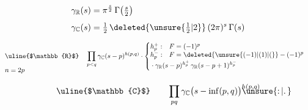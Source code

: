 \[
\begin{aligned}
\gamma_{\mathbb{R}}(s)&=\pi^{\frac{s}{2}}\,\Gamma\bigl(\tfrac{s}{2}\bigr)\\[4pt]
\gamma_{\mathbb{C}}(s)&=\tfrac{1}{2}\,\deleted{\unsure{\tfrac{1}{2}|2}}\,(2\pi)^{s}\,\Gamma(s)
\end{aligned}
\]

\[
\begin{aligned}
&\begin{aligned}[t]
&\text{\uline{$\mathbb{R}$}}\\[6pt]
&n=2p
\end{aligned}
\quad
\prod_{p<q}\gamma_{\mathbb{C}}(s-p)^{h(p,q)}\cdot
\left\{\begin{array}{@{}l@{\quad}l@{}}
h_{p}^{+}: & F=(-1)^{p}\\
h_{p}^{-}: & F=\deleted{\unsure{(-1)|(1)|(}}-(-1)^{p}\\[2pt]
\multicolumn{2}{@{}l@{}}{\displaystyle {}\cdot\gamma_{\mathbb{R}}(s-p)^{h_{p}^{+}}\,\gamma_{\mathbb{R}}(s-p+1)^{h_{p}^{-}}}
\end{array}\right.
\end{aligned}
\]

\[
\text{\uline{$\mathbb{C}$}}\qquad
\prod_{pq}\gamma_{\mathbb{C}}\bigl(s-\inf(p,q){\bigr)\rlap{\(\unsure{\mathpunct{:}|\mathpunct{.}}\)}}^{h(p,q)}
\]
\clearpage
